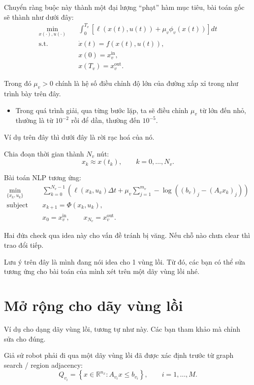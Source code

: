 \documentclass[12pt,a4paper]{article}
\begin{document}
Chuyển ràng buộc này thành một đại lượng ``phạt'' hàm mục tiêu, bài toán gốc sẽ thành như dưới đây:
\[
\begin{aligned}
    \min_{x(\cdot),u(\cdot)} \quad & \int_{0}^{T_v} \left[\ell(x(t),u(t)) + \mu_v \phi_v(x(t))\right] dt \\
    \text{s.t.} \quad & \dot{x}(t) = f(x(t),u(t)), \\
    & x(0) = x_v^{\mathrm{in}}, \\
    & x(T_v) = x_v^{\mathrm{out}}.
\end{aligned}
\]

Trong đó $\mu_v > 0$ chính là hệ số điều chỉnh độ lớn của đường xấp xỉ trong như trình bày trên đây.

\begin{itemize}
    \item Trong quá trình giải, qua từng bước lặp, ta sẽ điều chỉnh $\mu_v$ từ lớn đến nhỏ, thường là từ $10^{-2}$ rồi để dần, thường đến $10^{-5}$.
\end{itemize}

Ví dụ trên đây thì dưới đây là rời rạc hoá của nó.

Chia đoạn thời gian thành $N_v$ nút:
\[
    x_k \approx x(t_k), \qquad k=0,\ldots,N_v.
\]

Bài toán NLP tương ứng:
\[
\begin{aligned}
    \min_{\{x_k,u_k\}} \quad & \sum_{k=0}^{N_v-1}
    \left(
        \ell(x_k,u_k)\Delta t
        + \mu_v \sum_{j=1}^{m_v} -\log\left((b_v)_j - (A_v x_k)_j\right)
    \right) \\
    \text{subject to:} \quad & x_{k+1} = \Phi(x_k,u_k), \\
    & x_0 = x_v^{\mathrm{in}}, \qquad x_{N_v} = x_v^{\mathrm{out}}.
\end{aligned}
\]

Hai đứa check qua idea này cho vấn đề tránh bị văng. Nếu chỗ nào chưa clear thì trao đổi tiếp.

Lưu ý trên đây là mình đang nói idea cho 1 vùng lồi. Từ đó, các bạn có thể sửa tương ứng cho bài toán của mình xét trên một dãy vùng lồi nhé.

\section*{Mở rộng cho dãy vùng lồi}

Ví dụ cho dạng dãy vùng lồi, tương tự như này. Các bạn tham khảo mà chỉnh sửa cho đúng.

Giả sử robot phải đi qua một dãy vùng lồi đã được xác định trước từ graph search / region adjacency:
\[
    Q_{v_i} = \left\{x \in \mathbb{R}^{n_x} : A_{v_i}x \leq b_{v_i}\right\},
    \qquad i=1,\ldots,M.
\]
\end{document}
